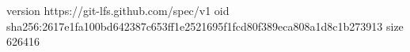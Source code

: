 version https://git-lfs.github.com/spec/v1
oid sha256:2617e1fa100bd642387c653ff1e2521695f1fcd80f389eca808a1d8c1b273913
size 626416
